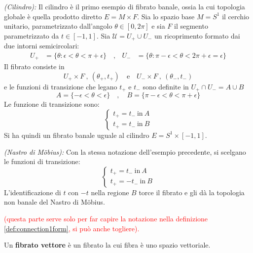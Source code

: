 \begin{example}\emph{(Cilindro): }\label{ex:cilindro}
   Il cilindro è il primo esempio di fibrato banale, ossia la cui topologia globale
   è quella prodotto diretto $E = M\times F$. Sia lo spazio base $M=S^1$ il cerchio
   unitario, parametrizzato dall'angolo $\theta \in [0,2\pi]$ e sia $F$ il segmento
   parametrizzato da $t \in [-1,1]$. Sia $\mathcal{U} = U_+ \cup U_-$ un ricoprimento
   formato dai due intorni semicircolari:
   \begin{equation*}
      \begin{aligned}
         U_+ &= \{\theta : \epsilon < \theta < \pi + \epsilon \} \quad ,&
         U_- &= \{\theta : \pi - \epsilon < \theta < 2\pi + \epsilon = \epsilon \}
      \end{aligned}
   \end{equation*}
   Il fibrato consiste in
      $$ U_+ \times F \: , \: (\theta_+,t_+) \mathrm{\quad e \quad}
         U_- \times F \: , \: (\theta_-,t_-) $$
  e le funzioni di transizione che legano $t_+$ e $t_-$ sono definite in
  $U_+\cap U_- = A \cup B$
  $$ A = \{ -\epsilon < \theta < \epsilon \} \quad , \quad
     B = \{ \pi-\epsilon < \theta < \pi + \epsilon \} $$
  Le funzione di transizione sono:
  $$ \begin{cases}
     t_+= t_- \mathrm{\: in \:} A \\
     t_+= t_- \mathrm{\: in \:} B
  \end{cases}$$
  Si ha quindi un fibrato banale uguale al cilindro $E = S^1 \times [-1,1]$.\\
\end{example}

\begin{example}\emph{(Nastro di Möbius): }\label{ex:mobius}
   Con la stessa notazione dell'esempio precedente, si scelgano le funzioni di
   transizione:
   $$ \begin{cases}
      t_+= t_- \mathrm{\: in \:} A \\
      t_+= -t_- \mathrm{\: in \:} B
   \end{cases}$$
   L'identificazione di $t$ con $-t$ nella regione $B$ torce il fibrato e gli dà
   la topologia non banale del Nastro di Möbius.
\end{example}
\textcolor{red}{
(questa parte serve solo per far capire la notazione nella definizione \ref{def:connection1form},
si può anche togliere).\\
}

Un \textbf{fibrato vettore} è un fibrato la cui fibra è uno spazio vettoriale.\\


